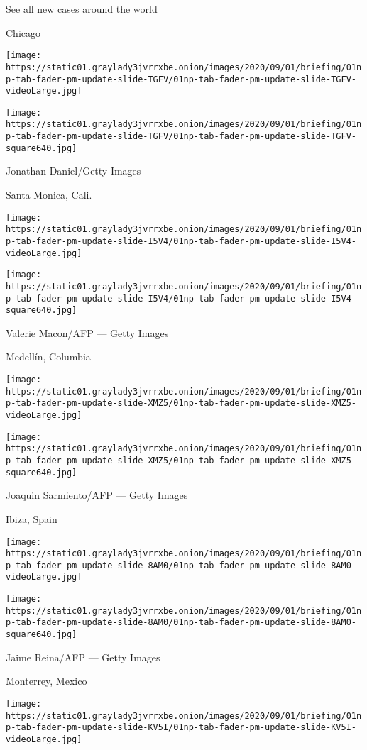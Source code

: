 See all new cases around the world

\href{https://www.nytimes3xbfgragh.onion/2020/08/01/world/coronavirus-covid-19.html}{}

Chicago

\texttt{[image: https://static01.graylady3jvrrxbe.onion/images/2020/09/01/briefing/01np-tab-fader-pm-update-slide-TGFV/01np-tab-fader-pm-update-slide-TGFV-videoLarge.jpg]}

\texttt{[image: https://static01.graylady3jvrrxbe.onion/images/2020/09/01/briefing/01np-tab-fader-pm-update-slide-TGFV/01np-tab-fader-pm-update-slide-TGFV-square640.jpg]}

 Jonathan Daniel/Getty Images

Santa Monica, Cali.

\texttt{[image: https://static01.graylady3jvrrxbe.onion/images/2020/09/01/briefing/01np-tab-fader-pm-update-slide-I5V4/01np-tab-fader-pm-update-slide-I5V4-videoLarge.jpg]}

\texttt{[image: https://static01.graylady3jvrrxbe.onion/images/2020/09/01/briefing/01np-tab-fader-pm-update-slide-I5V4/01np-tab-fader-pm-update-slide-I5V4-square640.jpg]}

 Valerie Macon/AFP --- Getty Images

Medellín, Columbia

\texttt{[image: https://static01.graylady3jvrrxbe.onion/images/2020/09/01/briefing/01np-tab-fader-pm-update-slide-XMZ5/01np-tab-fader-pm-update-slide-XMZ5-videoLarge.jpg]}

\texttt{[image: https://static01.graylady3jvrrxbe.onion/images/2020/09/01/briefing/01np-tab-fader-pm-update-slide-XMZ5/01np-tab-fader-pm-update-slide-XMZ5-square640.jpg]}

 Joaquin Sarmiento/AFP --- Getty Images

Ibiza, Spain

\texttt{[image: https://static01.graylady3jvrrxbe.onion/images/2020/09/01/briefing/01np-tab-fader-pm-update-slide-8AM0/01np-tab-fader-pm-update-slide-8AM0-videoLarge.jpg]}

\texttt{[image: https://static01.graylady3jvrrxbe.onion/images/2020/09/01/briefing/01np-tab-fader-pm-update-slide-8AM0/01np-tab-fader-pm-update-slide-8AM0-square640.jpg]}

 Jaime Reina/AFP --- Getty Images

Monterrey, Mexico

\texttt{[image: https://static01.graylady3jvrrxbe.onion/images/2020/09/01/briefing/01np-tab-fader-pm-update-slide-KV5I/01np-tab-fader-pm-update-slide-KV5I-videoLarge.jpg]}

